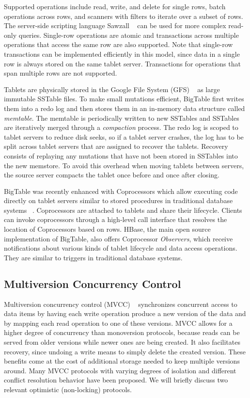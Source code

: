 \documentclass[10pt,final,journal]{IEEEtran}
\begin{document}
Supported operations include read, write, and delete for single rows, batch operations across rows, and scanners with filters to iterate over a subset of rows. The server-side scripting language Sawzall ~\cite{Pike:2005} can be used for more complex read-only queries. Single-row operations are atomic and transactions across multiple operations that access the same row are also supported. Note that single-row transactions can be implemented efficiently in this model, since data in a single row is always stored on the same tablet server. Transactions for operations that span multiple rows are not supported.

Tablets are physically stored in the Google File System (GFS) ~\cite{Ghemawat:2003:GFS:1165389.945450} as large immutable SSTable files. To make small mutations efficient, BigTable first writes them into a redo log and then stores them in an in-memory data structure called \emph{memtable}. The memtable is periodically written to new SSTables and SSTables are iteratively merged through a \emph{compaction} process. The redo log is scoped to tablet servers to reduce disk seeks, so if a tablet server crashes, the log has to be split across tablet servers that are assigned to recover the tablets. Recovery consists of replaying any mutations that have not been stored in SSTables into the new memstore. To avoid this overhead when moving tablets between servers, the source server compacts the tablet once before and once after closing.

BigTable was recently enhanced with Coprocessors which allow executing code directly on tablet servers similar to stored procedures in traditional database systems ~\cite{Dean:2009}. Coprocessors are attached to tablets and share their lifecycle. Clients can invoke coprocessors through a high-level call interface that resolves the location of Coprocessors based on rows. HBase, the main open source implementation of BigTable, also offers Coprocessor \emph{Observers}, which receive notifications about various kinds of tablet lifecycle and data access operations. They are similar to triggers in traditional database systems.

\subsection{Multiversion Concurrency Control}
Multiversion concurrency control (MVCC) ~\cite{Bernstein:1983:MCC:319996.319998} synchronizes concurrent access to data items by having each write operation produce a new version of the data and by mapping each read operation to one of these versions. MVCC allows for a higher degree of concurrency than monoversion protocols, because reads can be served from older versions while newer ones are being created. It also facilitates recovery, since undoing a write means to simply delete the created version. These benefits come at the cost of additional storage needed to keep multiple versions around. Many MVCC protocols with varying degrees of isolation and different conflict resolution behavior have been proposed. We will briefly discuss two relevant optimistic (non-locking) protocols.
\end{document}
